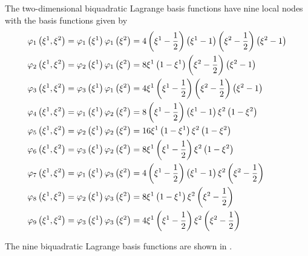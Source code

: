 The two-dimensional biquadratic Lagrange basis functions have nine local nodes
with the basis functions given by
\begin{equation}
  \begin{split}
    \lbfn{1}{\xione,\xitwo}&=\lbfn{1}{\xione}\lbfn{1}{\xitwo}=
    4\pbrac{\xione-\frac12}\pbrac{\xione-1}\pbrac{\xitwo-\frac12}\pbrac{\xitwo-1} \\
    \lbfn{2}{\xione,\xitwo}&=\lbfn{2}{\xione}\lbfn{1}{\xitwo}=
    8\xione\pbrac{1-\xione}\pbrac{\xitwo-\frac12}\pbrac{\xitwo-1} \\
    \lbfn{3}{\xione,\xitwo}&=\lbfn{3}{\xione}\lbfn{1}{\xitwo}=
    4\xione\pbrac{\xione-\frac12}\pbrac{\xitwo-\frac12}\pbrac{\xitwo-1} \\
    \lbfn{4}{\xione,\xitwo}&=\lbfn{1}{\xione}\lbfn{2}{\xitwo}=
    8\pbrac{\xione-\frac12}\pbrac{\xione-1}\xitwo\pbrac{1-\xitwo} \\
    \lbfn{5}{\xione,\xitwo}&=\lbfn{2}{\xione}\lbfn{2}{\xitwo}=
    16\xione\pbrac{1-\xione}\xitwo\pbrac{1-\xitwo} \\
    \lbfn{6}{\xione,\xitwo}&=\lbfn{3}{\xione}\lbfn{2}{\xitwo}=
    8\xione\pbrac{\xione-\frac12}\xitwo\pbrac{1-\xitwo} \\
    \lbfn{7}{\xione,\xitwo}&=\lbfn{1}{\xione}\lbfn{3}{\xitwo}=
    4\pbrac{\xione-\frac12}\pbrac{\xione-1}\xitwo\pbrac{\xitwo-\frac12} \\
    \lbfn{8}{\xione,\xitwo}&=\lbfn{2}{\xione}\lbfn{3}{\xitwo}=
    8\xione\pbrac{1-\xione}\xitwo\pbrac{\xitwo-\frac12} \\
    \lbfn{9}{\xione,\xitwo}&=\lbfn{3}{\xione}\lbfn{3}{\xitwo}=
    4\xione\pbrac{\xione-\frac12}\xitwo\pbrac{\xitwo-\frac12}
  \end{split}
\end{equation}

The nine \twodal biquadratic Lagrange basis functions are shown in .


